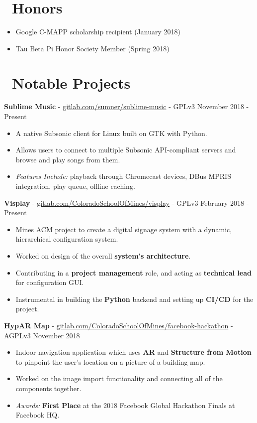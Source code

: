 \documentclass[10pt,letterpaper]{article}
\begin{document}
\section*{\faStar\ Honors}
\begin{itemize}
    \item Google C-MAPP scholarship recipient (January 2018)
    \item Tau Beta Pi Honor Society Member (Spring 2018)
\end{itemize}

\section*{\faCode\ Notable Projects}
\textbf{Sublime Music} -
\href{https://gitlab.com/sumner/sublime-music}{gitlab.com/sumner/sublime-music}
- GPLv3 \hfill November 2018 - Present
\begin{itemize}
    \item A native Subsonic client for Linux built on GTK with Python.
    \item Allows users to connect to multiple Subsonic API-compliant servers and
        browse and play songs from them.
    \item \textit{Features Include:} playback through Chromecast devices, DBus
        MPRIS integration, play queue, offline caching.
\end{itemize}

\textbf{Visplay} -
\href{https://gitlab.com/ColoradoSchoolOfMines/visplay}{gitlab.com/ColoradoSchoolOfMines/visplay}
- GPLv3 \hfill February 2018 - Present
\begin{itemize}
    \item Mines ACM project to create a digital signage system with a dynamic,
        hierarchical configuration system.
    \item Worked on design of the overall \textbf{system's architecture}.
    \item Contributing in a \textbf{project management} role, and acting as
        \textbf{technical lead} for configuration GUI.
    \item Instrumental in building the \textbf{Python} backend and setting up
        \textbf{CI/CD} for the project.
\end{itemize}

\textbf{HypAR Map} -
\href{https://gitlab.com/ColoradoSchoolOfMines/facebook-hackathon}{gitlab.com/ColoradoSchoolOfMines/facebook-hackathon}
- AGPLv3 \hfill November 2018
\begin{itemize}
    \item Indoor navigation application which uses \textbf{AR} and
        \textbf{Structure from Motion} to pinpoint the user's location on a
        picture of a building map.
    \item Worked on the image import functionality and connecting all of the
        components together.
    \item \textit{Awards:} \textbf{First Place} at the 2018 Facebook Global
        Hackathon Finals at Facebook HQ.
\end{itemize}
\end{document}
